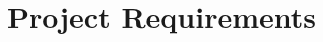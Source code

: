 
\section{Project Requirements}
\renewcommand{\labelenumi}{\theenumi}
\renewcommand{\labelenumii}{\theenumii}
\renewcommand{\labelenumiii}{\theenumiii}
\renewcommand{\labelenumiv}{\theenumiv}
\renewcommand{\theenumi}{\textbf{FR.\arabic{enumi}}}
\renewcommand{\theenumii}{\textbf{DR.\arabic{enumi}.\arabic{enumii}}}
\renewcommand{\theenumiii}{\textbf{DR.\arabic{enumi}.\arabic{enumii}.\arabic{enumiii}}}
\renewcommand{\theenumiv}{\textbf{DR.\arabic{enumi}.\arabic{enumii}.\arabic{enumiii}.\arabic{enumiv}}}

